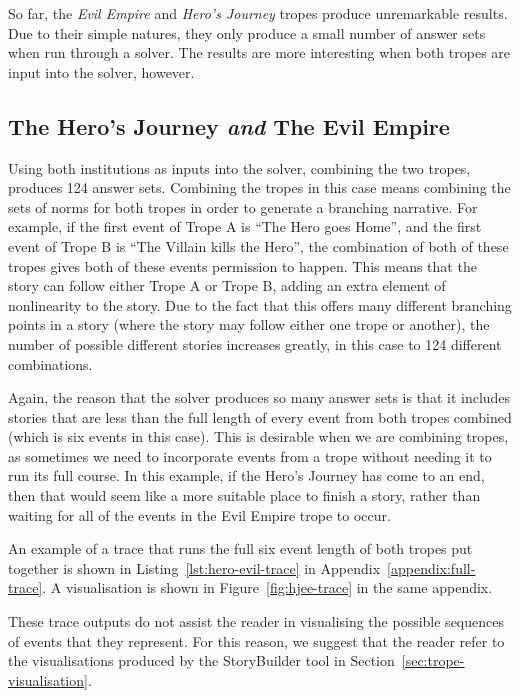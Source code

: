 \documentclass[11pt]{report}
\begin{document}
So far, the \emph{Evil Empire} and \emph{Hero's Journey} tropes produce
unremarkable results. Due to their simple natures, they only produce a small
number of answer sets when run through a solver. The results are more
interesting when both tropes are input into the solver, however.

\subsection{The Hero's Journey \emph{and} The Evil Empire}

Using both institutions as inputs into the solver, combining the two tropes, produces 124 answer sets. Combining the tropes in this case means
combining the sets of norms for both tropes in order to generate a branching
narrative. For example, if the first event of Trope A is ``The Hero goes Home'',
and the first event of Trope B is ``The Villain kills the Hero'', the
combination of both of these tropes gives both of these events permission to
happen. This means that the story can follow either Trope A or Trope B, adding
an extra element of nonlinearity to the story. Due to the fact that this offers
many different branching points in a story (where the story may follow either
one trope or another), the number of possible different stories increases
greatly, in this case to 124 different combinations.

Again, the reason that the solver produces so many answer sets is that it includes stories that
are less than the full length of every event from both tropes combined (which is
six events in this case). This is desirable when we are combining tropes, as
sometimes we need to incorporate events from a trope without needing it to run
its full course. In this example, if the Hero's Journey has come to an end, then
that would seem like a more suitable place to finish a story, rather than
waiting for all of the events in the Evil Empire trope to occur.

An example of a trace that runs the full six event length of both tropes put
together is shown in Listing~\ref{lst:hero-evil-trace} in
Appendix~\ref{appendix:full-trace}. A visualisation is shown in
Figure~\ref{fig:hjee-trace} in the same appendix.

These trace outputs do not assist the reader in visualising the possible
sequences of events that they represent. For this reason, we suggest that the
reader refer to the visualisations produced by the StoryBuilder tool in Section~\ref{sec:trope-visualisation}.
\end{document}
